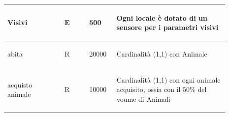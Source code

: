 \documentclass[12pt,a4paper]{article}
\begin{document}
\begin{center}
\begin{longtable}{|p{0.23\linewidth}|p{0.1\linewidth}|p{0.11\linewidth}|p{0.45\linewidth}|}
\hline
Visivi 				& \begin{center}
\vspace{-25pt}E
\end{center}
					& \begin{center}
					\vspace{-25pt}500\end{center}
					& \begin{flushleft}\vspace{-25pt} Ogni locale è dotato di un sensore per i parametri visivi \end{flushleft}\\ 

\hline
abita 				& \begin{center}
\vspace{-25pt}R
\end{center}
					& \begin{center}
					\vspace{-25pt}20000\end{center}
					& \begin{flushleft}\vspace{-25pt} Cardinalità (1,1) con Animale \end{flushleft}\\ 

\hline
acquisto animale 				& \begin{center}
\vspace{-25pt}R
\end{center}
					& \begin{center}
					\vspace{-25pt}10000\end{center}
					& \begin{flushleft}\vspace{-25pt} Cardinalità (1,1) con ogni animale acquisito, ossia con il $50\%$ del voume di Animali \end{flushleft}\\ 


\end{longtable}
\end{center}
\end{document}

